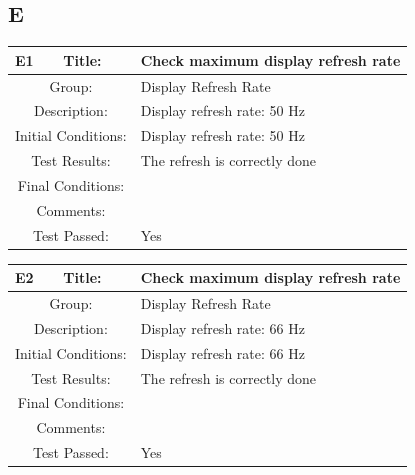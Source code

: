 \documentclass[12pt]{article}
\begin{document}
\subsection{E}
		\begin{table}[H]
	\begin{center}
		\begin{tabular}{| m{2cm}|m{2cm}|m{12cm}|}
			\hline 
			\bf E1&\bf Title:&\bf Check maximum display refresh rate\\ 
			\hline 
			\multicolumn{2}{|c|}{Group:}&Display Refresh Rate\\ 
			\hline 
			\multicolumn{2}{|c|}{Description:}&Display refresh rate: 50 Hz\\ 
			\hline 
			\multicolumn{2}{|c|}{Initial Conditions:}&Display refresh rate: 50 Hz\\ 
			\hline 
			\multicolumn{2}{|c|}{Test Results:}&The refresh is correctly done\\ 
			\hline 
			\multicolumn{2}{|c|}{Final Conditions:}&\\ 
			\hline 
			\multicolumn{2}{|c|}{Comments:}&\\ 
			\hline 
			\multicolumn{2}{|c|}{Test Passed:}&Yes \\ 
			\hline 
		\end{tabular} 
	\end{center}
\end{table}	
		\begin{table}[H]
	\begin{center}
		\begin{tabular}{| m{2cm}|m{2cm}|m{12cm}|}
			\hline 
			\bf E2&\bf Title:&\bf Check maximum display refresh rate\\ 
			\hline 
			\multicolumn{2}{|c|}{Group:}&Display Refresh Rate\\ 
			\hline 
			\multicolumn{2}{|c|}{Description:}&Display refresh rate: 66 Hz\\ 
			\hline 
			\multicolumn{2}{|c|}{Initial Conditions:}&Display refresh rate: 66 Hz\\ 
			\hline 
			\multicolumn{2}{|c|}{Test Results:}&The refresh is correctly done\\ 
			\hline 
			\multicolumn{2}{|c|}{Final Conditions:}&\\ 
			\hline 
			\multicolumn{2}{|c|}{Comments:}&\\ 
			\hline 
			\multicolumn{2}{|c|}{Test Passed:}&Yes \\ 
			\hline 
		\end{tabular} 
	\end{center}
\end{table}	
\end{document}
